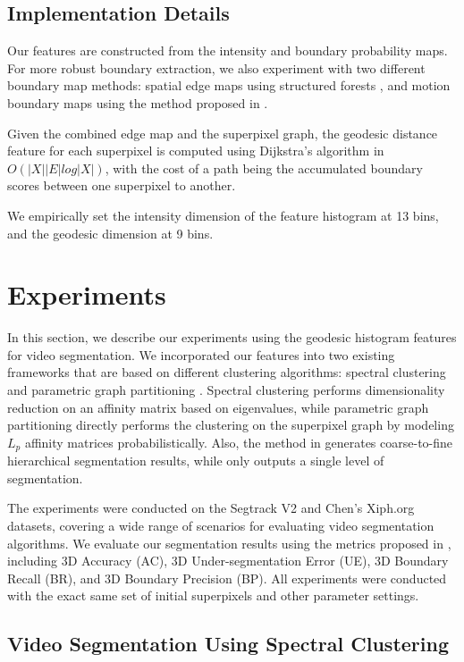 \documentclass[runningheads]{llncs}
\begin{document}
\subsection{Implementation Details }
\label{sec:ID}
Our features are constructed from the intensity and boundary probability maps. For more robust boundary extraction, we also  experiment with two different boundary map methods: spatial edge maps using structured forests \cite{export:202540}, and motion boundary maps using the method proposed in \cite{Weinzaepfel_2015_CVPR}.  

Given the combined edge map and the superpixel graph, the geodesic distance feature for each superpixel is computed using Dijkstra's algorithm in $O(|X||E|log|X|)$, with the cost of a path being the accumulated boundary scores between one superpixel to another. 

We empirically set the intensity dimension of the feature histogram at 13 bins, and the geodesic dimension at 9 bins. 

\section{ Experiments}
\label{sec:exp}
In this section, we describe our experiments using the geodesic histogram features for video segmentation. We incorporated our features into two existing frameworks that are based on different clustering algorithms: spectral clustering \cite{Galasso2013} and parametric graph partitioning \cite{Yu_2015_ICCV}. Spectral clustering performs dimensionality reduction on an affinity matrix based on eigenvalues, while parametric graph partitioning directly performs the clustering on the superpixel graph by modeling $L_p$ affinity matrices probabilistically. Also, the method in \cite{Galasso2013} generates coarse-to-fine hierarchical segmentation results, while \cite{Yu_2015_ICCV} only outputs a single level of segmentation. 

The experiments were conducted on the Segtrack V2 \cite{SegTrackv2_dataset} and Chen's Xiph.org \cite{Chen_dataset} datasets, covering a wide range of scenarios for evaluating video segmentation algorithms. We evaluate our segmentation results using the metrics proposed in \cite{6247802}, including 3D Accuracy (AC), 3D Under-segmentation Error (UE), 3D Boundary Recall (BR), and 3D Boundary Precision (BP). All experiments were conducted with the exact same set of initial superpixels and other parameter settings.

\subsection{Video Segmentation Using Spectral Clustering}
\end{document}
